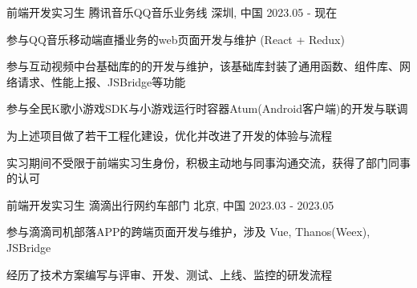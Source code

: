 

\begin{cventries}
    \cventry
    {前端开发实习生} %
    {腾讯音乐\hspace{2mm}QQ音乐业务线} %
    {深圳, 中国} %
    {2023.05 - 现在} %
    {
        \begin{cvitems} %
            \item {参与QQ音乐移动端直播业务的web页面开发与维护 (React + Redux)}
            \item {参与互动视频中台基础库的的开发与维护，该基础库封装了通用函数、组件库、网络请求、性能上报、JSBridge等功能}
            \item {参与全民K歌小游戏SDK与小游戏运行时容器Atum(Android客户端)的开发与联调}
            \item {为上述项目做了若干工程化建设，优化并改进了开发的体验与流程}
            \item {实习期间不受限于前端实习生身份，积极主动地与同事沟通交流，获得了部门同事的认可}
        \end{cvitems}
    }

    \cventry
    {前端开发实习生} %
    {滴滴出行\hspace{2mm}网约车部门} %
    {北京, 中国} %
    {2023.03 - 2023.05} %
    {
        \begin{cvitems} %
            \item {参与滴滴司机部落APP的跨端页面开发与维护，涉及 Vue, Thanos(Weex), JSBridge }
            \item {经历了技术方案编写与评审、开发、测试、上线、监控的研发流程}
        \end{cvitems}
    }
\end{cventries}
